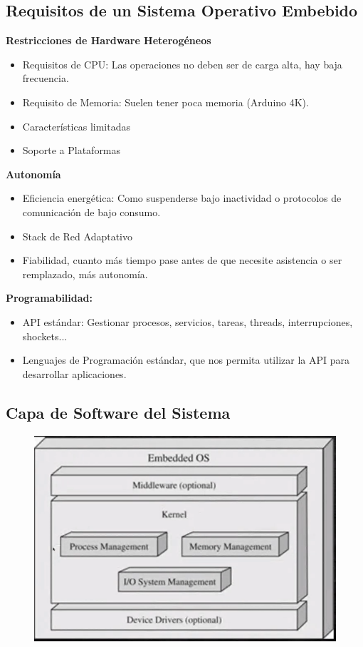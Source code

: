 \documentclass[12pt, twoside, openright]{report} %
\begin{document}
\subsection{Requisitos de un Sistema Operativo Embebido}
\textbf{Restricciones de Hardware Heterogéneos}
\begin{itemize}
	\item Requisitos de CPU: Las operaciones no deben ser de carga alta, hay baja frecuencia.
	\item Requisito de Memoria: Suelen tener poca memoria (Arduino 4K).
	\item Características limitadas
	\item Soporte a Plataformas
\end{itemize}

\textbf{Autonomía}
\begin{itemize}
	\item Eficiencia energética: Como suspenderse bajo inactividad o protocolos de comunicación de bajo consumo.
	\item Stack de Red Adaptativo
	\item Fiabilidad, cuanto más tiempo pase antes de que necesite asistencia o ser remplazado, más autonomía.
\end{itemize}

\textbf{Programabilidad:}
\begin{itemize}
	\item API estándar: Gestionar procesos, servicios, tareas, threads, interrupciones, shockets...
	\item Lenguajes de Programación estándar, que nos permita utilizar la API para desarrollar aplicaciones.
\end{itemize}

\subsection{Capa de Software del Sistema}
\begin{figure}[H]
	{\includegraphics[scale=.5]{2021-03-25 10_06_39-2021-03-24 16-59-20.mkv.png}}
\end{figure}
\end{document}

